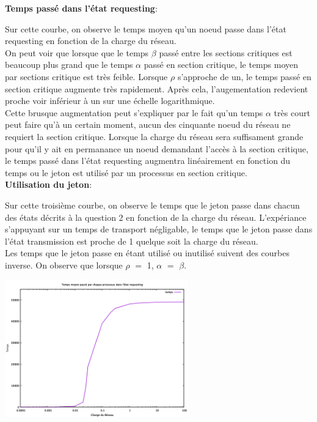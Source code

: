 \documentclass[11pt,a4paper]{report}
\begin{document}
\textbf{Temps passé dans l'état requesting}:

Sur cette courbe, on observe le temps moyen qu'un noeud passe dans l'état requesting en fonction de la charge du réseau.\\

On peut voir que lorsque que le temps $\beta$ passé entre les sections critiques est beaucoup plus grand que le temps $\alpha$ passé en section critique, le temps moyen par sections critique est très feible. Lorsque $\rho$ s'approche de un, le temps passé en section critique augmente très rapidement. Après cela, l'augementation redevient proche voir inférieur à un sur une échelle logarithmique.\\

Cette brusque augmentation peut s'expliquer par le fait qu'un temps $\alpha$ très court peut faire qu'à un certain moment, aucun des cinquante noeud du réseau ne requiert la section critique. Lorsque la charge du réseau sera suffisament grande pour qu'il y ait en permanance un noeud demandant l'accès à la section critique, le temps passé dans l'état requesting augmentra linéairement en fonction du temps ou le jeton est utilisé par un processus en section critique.\\

\textbf{Utilisation du jeton}:

Sur cette troisième courbe, on observe le temps que le jeton passe dans chacun des états décrits à la question 2 en fonction de la charge du réseau. L'expériance s'appuyant sur un temps de transport négligable, le temps que le jeton passe dans l'état transmission est proche de 1 quelque soit la charge du réseau.\\

Les temps que le jeton passe en étant utilisé ou inutilisé suivent des courbes inverse. On observe que lorsque $\rho$ $=$ 1, $\alpha$ $=$ $\beta$.


\includegraphics[width=300]{Temps_etat_requesting.png}
\end{document}
